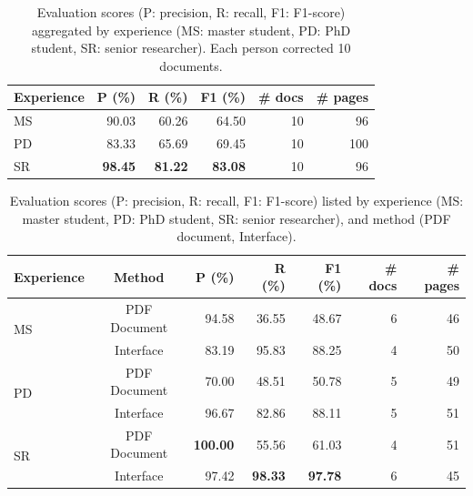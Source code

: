 \documentclass[]{interact}
\theoremstyle{plain} %
\theoremstyle{definition}
\theoremstyle{remark}
\begin{document}
\begin{table}[h]
\centering
\caption{Evaluation scores (P: precision, R: recall, F1: F1-score) aggregated by experience (MS: master student, PD: PhD student, SR: senior researcher). Each person corrected 10 documents.}
\begin{tabular}{lrrrrr}
\toprule
\textbf{Experience} & \textbf{P (\%)}   & \textbf{R (\%)}   & \textbf{F1 (\%)}  & \textbf{\#  docs} & \textbf{\# pages}\\
\midrule
MS      & 90.03             & 60.26             & 64.50           & 10  & 96    \\
PD      & 83.33             & 65.69             & 69.45           & 10  & 100   \\
SR      & \textbf{98.45}    & \textbf{81.22}    & \textbf{83.08}  & 10  & 96  \\
\bottomrule
\end{tabular}
\label{tab:accuracy-by-experience}
\end{table}


\begin{table}[h]
\centering\small
\caption{Evaluation scores (P: precision, R: recall, F1: F1-score) listed by experience (MS: master student, PD: PhD student, SR: senior researcher), and method (PDF document, Interface). }
\begin{tabular}{lcrrrrr}
\toprule
\textbf{Experience} & \textbf{Method} & \textbf{P (\%)} & \textbf{R (\%)} & 
\textbf{F1 (\%)}  & \textbf{\# docs} & \textbf{\# pages}\\
\midrule
\multirow{2}{*}{MS} & PDF Document & 94.58 & 36.55 & 48.67 & 6 & 46 \\
 & Interface & 83.19 & 95.83 & 88.25 & 4 & 50 \\
\midrule
\multirow{2}{*}{PD} & PDF Document & 70.00 & 48.51 & 50.78 & 5 & 49 \\
 & Interface & 96.67 & 82.86 & 88.11 & 5 & 51\\
\midrule
\multirow{2}{*}{SR} & PDF Document & \textbf{100.00} & 55.56 & 61.03 & 4 & 51\\
 & Interface & 97.42 & \textbf{98.33} & \textbf{97.78} & 6 & 45\\
\bottomrule
\end{tabular}
\label{tab:accuracy-by-experience-method}
\end{table}

\clearpage

\appendix

\end{document}
